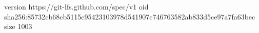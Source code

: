 version https://git-lfs.github.com/spec/v1
oid sha256:85732cb68cb5115c95423103978d541907c746763582ab833d5ce97a7fa63bec
size 1003
